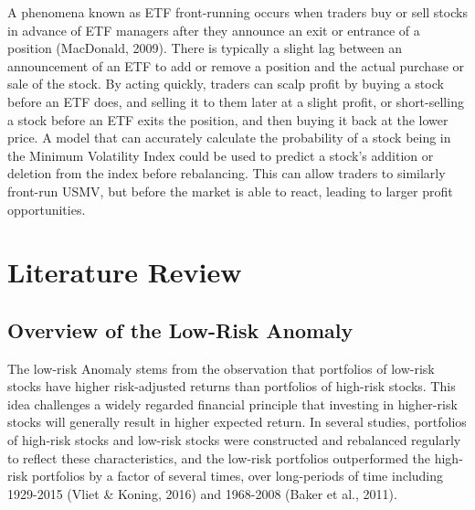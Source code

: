 \documentclass[12pt,twoside]{reedthesis}
\theoremstyle{definition}
\theoremstyle{definition}
\theoremstyle{definition}
\theoremstyle{remark}
\begin{document}
A phenomena known as ETF front-running occurs when traders buy or sell
stocks in advance of ETF managers after they announce an exit or
entrance of a position (MacDonald, 2009). There is typically a slight
lag between an announcement of an ETF to add or remove a position and
the actual purchase or sale of the stock. By acting quickly, traders can
scalp profit by buying a stock before an ETF does, and selling it to
them later at a slight profit, or short-selling a stock before an ETF
exits the position, and then buying it back at the lower price. A model
that can accurately calculate the probability of a stock being in the
Minimum Volatility Index could be used to predict a stock's addition or
deletion from the index before rebalancing. This can allow traders to
similarly front-run USMV, but before the market is able to react,
leading to larger profit opportunities.

\chapter{Literature Review}\label{literature-review}

\section{Overview of the Low-Risk
Anomaly}\label{overview-of-the-low-risk-anomaly}

The low-risk Anomaly stems from the observation that portfolios of
low-risk stocks have higher risk-adjusted returns than portfolios of
high-risk stocks. This idea challenges a widely regarded financial
principle that investing in higher-risk stocks will generally result in
higher expected return. In several studies, portfolios of high-risk
stocks and low-risk stocks were constructed and rebalanced regularly to
reflect these characteristics, and the low-risk portfolios outperformed
the high-risk portfolios by a factor of several times, over long-periods
of time including 1929-2015 (Vliet \& Koning, 2016) and 1968-2008 (Baker
et al., 2011).
\end{document}
